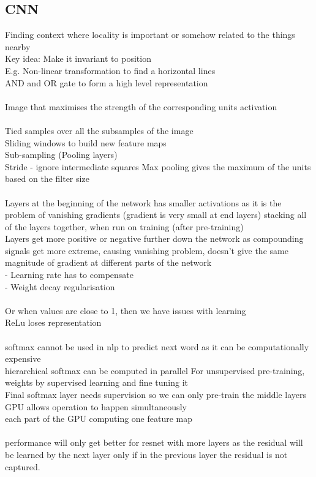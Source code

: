 \documentclass[11pt]{article}
\begin{document}
\subsection*{CNN}
Finding context where locality is important or somehow related to the things nearby\\
Key idea: Make it invariant to position\\
E.g. Non-linear transformation to find a horizontal lines\\
AND and OR gate to form a high level representation\\
\\
Image that maximises the strength of the corresponding units activation\\
\\
Tied samples over all the subsamples of the image\\
Sliding windows to build new feature maps\\
Sub-sampling (Pooling layers)\\
Stride - ignore intermediate squares
Max pooling gives the maximum of the units based on the filter size\\
\\
Layers at the beginning of the network has smaller activations as it is the problem of vanishing gradients (gradient is very small at end layers) stacking all of the layers together, when run on training (after pre-training)
\\
Layers get more positive or negative further down the network as compounding signals get more extreme, causing vanishing problem, doesn't give the same magnitude of gradient at different parts of the network
\\
- Learning rate has to compensate\\
- Weight decay regularisation 
\\\\ 
Or when values are close to 1, then we have issues with learning
\\
ReLu loses representation \\
\\
softmax cannot be used in nlp to predict next word as it can be computationally expensive
\\
hierarchical softmax can be computed in parallel
For unsupervised pre-training, weights by supervised learning and fine tuning it
\\
Final softmax layer needs supervision so we can only pre-train the middle layers
\\
GPU allows operation to happen simultaneously\\
each part of the GPU computing one feature map
\\
\\
performance will only get better for resnet with more layers as the residual will be learned by the next layer only if in the previous layer the residual is not captured.
\end{document}
